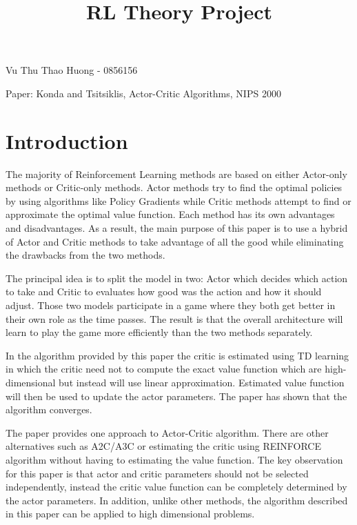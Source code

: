 \documentclass{article}
\title{RL Theory Project}
\begin{document}
\maketitle

\begin{small}
Vu Thu Thao Huong - 0856156

Paper: Konda and Tsitsiklis, Actor-Critic Algorithms, NIPS 2000
\end{small}

\section{Introduction}
\label{section:intro}

\begin{flushleft}

The majority of Reinforcement Learning methods are based on either Actor-only methods or Critic-only methods.  Actor methods try to find the optimal policies by using algorithms like Policy Gradients while Critic methods attempt to find or approximate the optimal value function. Each method has its own advantages and disadvantages. As a result, the main purpose of this paper is to use a hybrid of Actor and Critic methods to take advantage of all the good while eliminating the drawbacks from the two methods. 

The principal idea is to split the model in two: Actor which decides which action to take and Critic to evaluates how good was the action and how it should adjust. Those two models participate in a game where they both get better in their own role as the time passes. The result is that the overall architecture will learn to play the game more efficiently than the two methods separately.

In the algorithm provided by this paper the critic is estimated using TD learning in which the critic need not to compute the exact value function which are high-dimensional but instead will use linear approximation. Estimated value function will then be used to update the actor parameters. The paper has shown that the algorithm converges.

The paper provides one approach to Actor-Critic algorithm. There are other alternatives such as A2C/A3C or estimating the critic using REINFORCE algorithm without having to estimating the value function.  The key observation for this paper is that actor and critic parameters should not be selected independently, instead the critic value function can be completely determined by the actor parameters. In addition, unlike other methods, the algorithm described in this paper can be applied to high dimensional problems. 

\end{flushleft}
\end{document}
